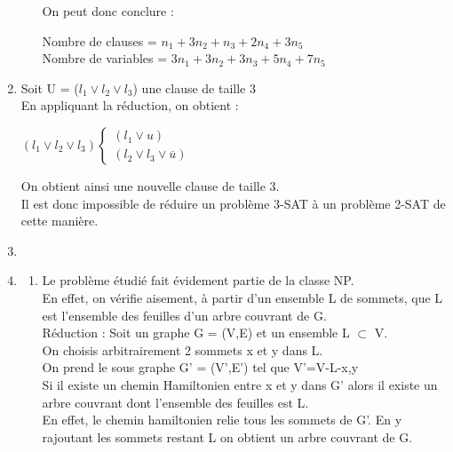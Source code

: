 \documentclass[]{article}
\begin{document}
\begin{enumerate}
\begin{enumerate}
      On peut donc conclure :
      \begin{center}
        Nombre de clauses = $n_1 + 3n_2 + n_3 + 2n_4 + 3n_5$\\
        Nombre de variables = $3n_1 + 3n_2 + 3n_3 + 5n_4 + 7n_5$\\
      \end{center}
      \bigbreak

\end{enumerate}
  
  \item
    Soit U = ($l_1 \vee l_2 \vee l_3$) une clause de taille 3\\
    \smallbreak
    En appliquant la réduction, on obtient :\\
    
    \begin{center}
      $(l_1 \vee l_2 \vee l_3)\left\lbrace 
      \begin{array}{lcl}
        (l_1 \vee u)\\
        (l_2 \vee l_3 \vee \overline u)
      \end{array}\right.$
    \end{center}
    \smallbreak

    On obtient ainsi une nouvelle clause de taille 3.\\
    Il est donc impossible de réduire un problème 3-SAT à un problème 2-SAT de cette manière.\\
    \smallbreak

    \item
    \smallbreak

    \item
      \begin{enumerate}
        \item
          Le problème étudié fait évidement partie de la classe NP.\\
          En effet, on vérifie aisement, à partir d'un ensemble L de sommets, que L est l'ensemble des feuilles d'un arbre couvrant de G.\\

          Réduction :
          Soit un graphe G = (V,E) et un ensemble L $\subset$ V.\\
          On choisis arbitrairement 2 sommets x et y dans L.  \\        
          On prend le sous graphe G' = (V',E') tel que V'={V-{L-{x,y}}}\\
          

          Si il existe un chemin Hamiltonien entre x et y dans G' alors il existe un arbre couvrant dont l'ensemble des feuilles est L.\\
          En effet, le chemin hamiltonien relie tous les sommets de G'. En y rajoutant les sommets restant L on obtient un arbre couvrant de G.\\


\end{enumerate}
\end{enumerate}
\end{document}
